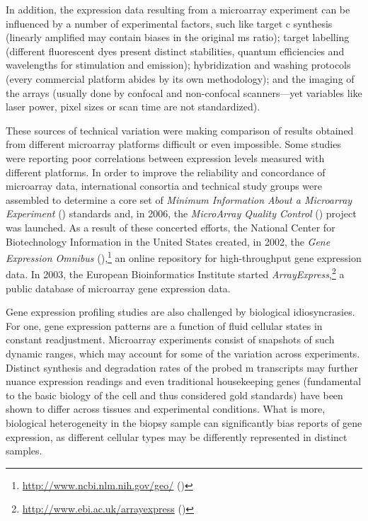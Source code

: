 \medskip

In addition, the expression data resulting from a microarray experiment can be
influenced by a number of experimental factors, such like target
c synthesis (linearly amplified  may contain
biases in the original ms ratio);\cite{nygaard_options_2006}
target labelling (different fluorescent dyes present distinct stabilities,
quantum efficiencies and wavelengths for stimulation and emission);
hybridization and washing protocols (every commercial platform abides by its own
methodology); and the imaging of the arrays (usually done by confocal and
non-confocal scanners---yet variables like laser power, pixel sizes or scan time
are not standardized).

These sources of technical variation were making comparison of results obtained
from different microarray platforms difficult or even impossible.  Some studies
were reporting poor correlations between expression levels measured with
different platforms.\cite{tan_evaluation_2003,shi_cross-platform_2005} In order
to improve the reliability and concordance of microarray data, international
consortia and technical study groups were assembled to determine a core set of
\emph{Minimum Information About a Microarray Experiment} ()
standards\cite{brazma_minimum_2001} and, in 2006, the \emph{MicroArray Quality
  Control} () project was
launched.\cite{maqc_consortium_microarray_2006} As a result of these concerted
efforts, the National Center for Biotechnology Information in the United States
created, in 2002, the \emph{Gene Expression Omnibus}
(),\footnote{\url{http://www.ncbi.nlm.nih.gov/geo/}
  (\citealp{edgar_gene_2002})} an online repository for \mbox{high-throughput}
gene expression data.  In 2003, the European Bioinformatics Institute started
\emph{ArrayExpress},\footnote{\url{http://www.ebi.ac.uk/arrayexpress}
  (\citealp{brazma_arrayexpress--public_2003})} a public database of microarray
gene expression data.

Gene expression profiling studies are also challenged by biological
idiosyncrasies.  For one, gene expression patterns are a function of fluid
cellular states in constant readjustment.  Microarray experiments consist of
snapshots of such dynamic ranges, which may account for some of the variation
across experiments.  Distinct synthesis and degradation rates of the probed
m transcripts may further nuance expression readings and even
traditional housekeeping genes (fundamental to the basic biology of the cell and
thus considered gold standards) have been shown to differ across tissues and
experimental conditions.\cite{thorrez_using_2008} What is more, biological
heterogeneity in the biopsy sample can significantly bias reports of gene
expression, as different cellular types may be differently represented in
distinct samples.

